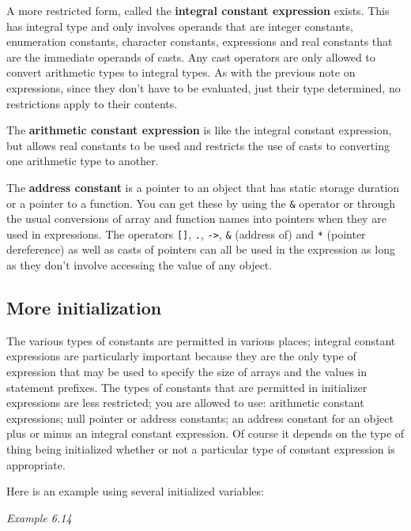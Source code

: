    A more restricted form, called the \textbf{integral constant
    expression} exists. This has integral type and only involves operands
    that are integer constants, enumeration constants, character constants,
    \sizeof{} expressions and real constants that are the immediate
    operands of casts. Any cast operators are only allowed to convert
    arithmetic types to integral types. As with the previous note on
    \sizeof{} expressions, since they don't have to be evaluated,
    just their type determined, no restrictions apply to their contents.


   The \textbf{arithmetic constant expression} is like the integral
    constant expression, but allows real constants to be used and restricts the
    use of casts to converting one arithmetic type to another.


   The \textbf{address constant} is a pointer to an object that has static
    storage duration or a pointer to a function. You can get these by using the
    \texttt{\&} operator or through the usual conversions of array and
    function names into pointers when they are used in expressions. The
    operators \texttt{[]}, \texttt{.}, \texttt{->},
    \texttt{\&} (address of) and \texttt{*} (pointer dereference) as
    well as casts of pointers can all be used in the expression as long as they
    don't involve accessing the value of any object.


  

  \subsection{More initialization}
   

   The various types of constants are permitted in various places; integral
    constant expressions are particularly important because they are the only
    type of expression that may be used to specify the size of arrays and the
    values in \case{} statement prefixes. The types of constants that
    are permitted in initializer expressions are less restricted; you are
    allowed to use: arithmetic constant expressions; null pointer or address
    constants; an address constant for an object plus or minus an integral
    constant expression. Of course it depends on the type of thing being
    initialized whether or not a particular type of constant expression is
    appropriate.


   Here is an example using several initialized variables:


   \begin{center}\textit{Example 6.14}\end{center}


